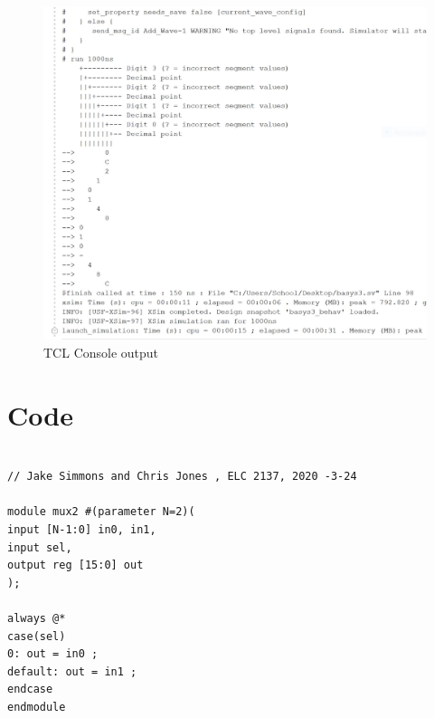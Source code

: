 \documentclass[11pt]{article}
\begin{document}
\begin{figure}[ht]\centering
	
	\includegraphics[width=1.0\textwidth]{TCL_Console}
	\caption{TCL Console output }
	\label{fig:sim_with_table}
\end{figure}


\clearpage


\section*{Code}

\begin{lstlisting}[style=Verilog,caption=Mux 2 Source File ,label=code:ex ]

// Jake Simmons and Chris Jones , ELC 2137, 2020 -3-24

module mux2 #(parameter N=2)(
input [N-1:0] in0, in1,
input sel,
output reg [15:0] out
);

always @*
case(sel)
0: out = in0 ;
default: out = in1 ;
endcase
endmodule



\end{lstlisting}
\end{document}
